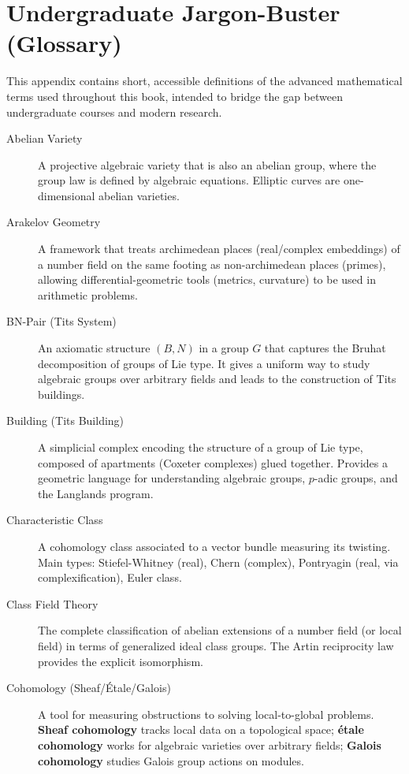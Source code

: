 \chapter{Undergraduate Jargon-Buster (Glossary)}

This appendix contains short, accessible definitions of the advanced mathematical terms used throughout this book, intended to bridge the gap between undergraduate courses and modern research.

\begin{description}
    \item[Abelian Variety] A projective algebraic variety that is also an abelian group, where the group law is defined by algebraic equations. Elliptic curves are one-dimensional abelian varieties.

    \item[Arakelov Geometry] A framework that treats archimedean places (real/complex embeddings) of a number field on the same footing as non-archimedean places (primes), allowing differential-geometric tools (metrics, curvature) to be used in arithmetic problems.

    \item[BN-Pair (Tits System)] An axiomatic structure $(B,N)$ in a group $G$ that captures the Bruhat decomposition of groups of Lie type. It gives a uniform way to study algebraic groups over arbitrary fields and leads to the construction of Tits buildings.

    \item[Building (Tits Building)] A simplicial complex encoding the structure of a group of Lie type, composed of apartments (Coxeter complexes) glued together. Provides a geometric language for understanding algebraic groups, $p$-adic groups, and the Langlands program.

    \item[Characteristic Class] A cohomology class associated to a vector bundle measuring its twisting. Main types: Stiefel-Whitney (real), Chern (complex), Pontryagin (real, via complexification), Euler class.

    \item[Class Field Theory] The complete classification of abelian extensions of a number field (or local field) in terms of generalized ideal class groups. The Artin reciprocity law provides the explicit isomorphism.

    \item[Cohomology (Sheaf/Étale/Galois)] A tool for measuring obstructions to solving local-to-global problems. \textbf{Sheaf cohomology} tracks local data on a topological space; \textbf{étale cohomology} works for algebraic varieties over arbitrary fields; \textbf{Galois cohomology} studies Galois group actions on modules.


\end{description}
